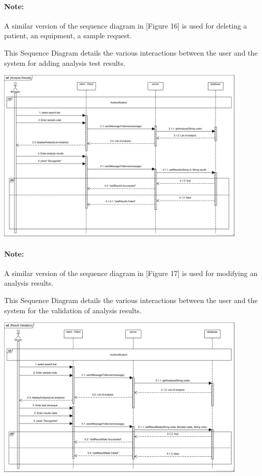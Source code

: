 \documentclass{article}
\begin{document}
\paragraph*{\textbf{Note: }} A similar version of the sequence diagram in [Figure 16] is used for deleting a patient, an equipment, a sample request.

\newpage
This Sequence Diagram details the various interactions between the user and the system for adding analysis test results.

\begin{center}
    \includegraphics[width=451px]{media/sequence diagrams/Analysis Results.png}
\end{center}

\paragraph*{\textbf{Note: }} A similar version of the sequence diagram in [Figure 17] is used for modifying an analysis results.

\newpage
This Sequence Diagram details the various interactions between the user and the system for the validation of analysis results.

\begin{center}
    \includegraphics[width=451px]{media/sequence diagrams/result validation.png}
\end{center}
\end{document}
